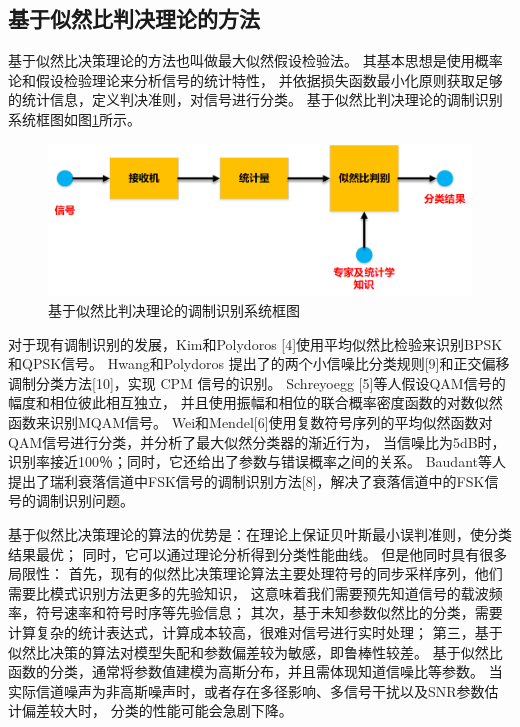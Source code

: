 \subsection{基于似然比判决理论的方法}

基于似然比决策理论的方法也叫做最大似然假设检验法。 
其基本思想是使用概率论和假设检验理论来分析信号的统计特性，
并依据损失函数最小化原则获取足够的统计信息，定义判决准则，对信号进行分类。
基于似然比判决理论的调制识别系统框图如图\ref{sec:fig_1_0}所示。\par

\begin{figure}
	\centering
	\includegraphics[scale=0.55]{figures/chapter_1/fig_1_0}
	\caption{基于似然比判决理论的调制识别系统框图} \label{sec:fig_1_0}
\end{figure}

对于现有调制识别的发展，Kim和Polydoros [4]使用平均似然比检验来识别BPSK和QPSK信号。
Hwang和Polydoros 提出了的两个小信噪比分类规则[9]和正交偏移调制分类方法[10]，实现 CPM 信号的识别。
Schreyoegg [5]等人假设QAM信号的幅度和相位彼此相互独立，
并且使用振幅和相位的联合概率密度函数的对数似然函数来识别MQAM信号。 
Wei和Mendel[6]使用复数符号序列的平均似然函数对QAM信号进行分类，并分析了最大似然分类器的渐近行为，
当信噪比为5dB时，识别率接近100％；同时，它还给出了参数与错误概率之间的关系。
Baudant等人提出了瑞利衰落信道中FSK信号的调制识别方法[8]，解决了衰落信道中的FSK信号的调制识别问题。\par
 
基于似然比决策理论的算法的优势是：在理论上保证贝叶斯最小误判准则，使分类结果最优；
同时，它可以通过理论分析得到分类性能曲线。
但是他同时具有很多局限性：
首先，现有的似然比决策理论算法主要处理符号的同步采样序列，他们需要比模式识别方法更多的先验知识，
这意味着我们需要预先知道信号的载波频率，符号速率和符号时序等先验信息；
其次，基于未知参数似然比的分类，需要计算复杂的统计表达式，计算成本较高，很难对信号进行实时处理；
第三，基于似然比决策的算法对模型失配和参数偏差较为敏感，即鲁棒性较差。
基于似然比函数的分类，通常将参数值建模为高斯分布，并且需体现知道信噪比等参数。
当实际信道噪声为非高斯噪声时，或者存在多径影响、多信号干扰以及SNR参数估计偏差较大时，
分类的性能可能会急剧下降。\par
 
